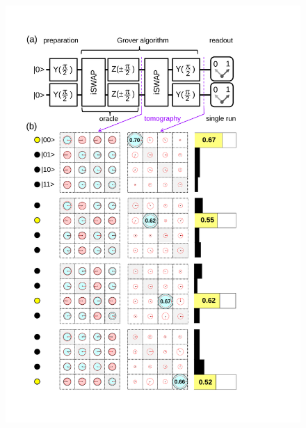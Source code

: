 \begin{figure}
	\centering
		\includegraphics[width=1.\textwidth]{./material/papers/grover/submission1/Fig3}
	\label{fig:Grover3}
	\caption{}
\end{figure}



